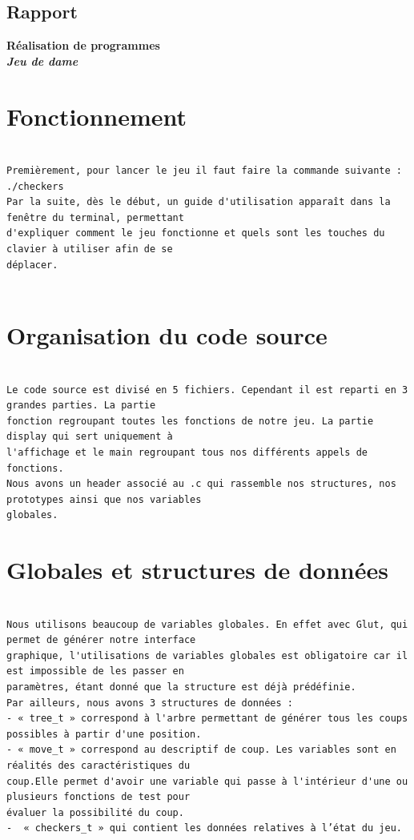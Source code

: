 \documentclass[a4paper]{article}
\begin{document}
\begin{center}\section*{Rapport}
{\Large\bf
Réalisation de programmes\\}
\large\bf\it{Jeu de dame}
\end{center}


\section{Fonctionnement}

\begin{verbatim}

Premièrement, pour lancer le jeu il faut faire la commande suivante : ./checkers
Par la suite, dès le début, un guide d'utilisation apparaît dans la fenêtre du terminal, permettant
d'expliquer comment le jeu fonctionne et quels sont les touches du clavier à utiliser afin de se 
déplacer.
 

\end{verbatim}


\section{Organisation du code source}


\begin{verbatim}

Le code source est divisé en 5 fichiers. Cependant il est reparti en 3 grandes parties. La partie
fonction regroupant toutes les fonctions de notre jeu. La partie display qui sert uniquement à
l'affichage et le main regroupant tous nos différents appels de fonctions.
Nous avons un header associé au .c qui rassemble nos structures, nos prototypes ainsi que nos variables 
globales.

\end{verbatim}


\section{Globales et structures de données}


\begin{verbatim}

Nous utilisons beaucoup de variables globales. En effet avec Glut, qui permet de générer notre interface
graphique, l'utilisations de variables globales est obligatoire car il est impossible de les passer en
paramètres, étant donné que la structure est déjà prédéfinie.
Par ailleurs, nous avons 3 structures de données :
- « tree_t » correspond à l'arbre permettant de générer tous les coups possibles à partir d'une position.
- « move_t » correspond au descriptif de coup. Les variables sont en réalités des caractéristiques du 
coup.Elle permet d'avoir une variable qui passe à l'intérieur d'une ou plusieurs fonctions de test pour
évaluer la possibilité du coup.
-  « checkers_t » qui contient les données relatives à l’état du jeu.

\end{verbatim}
\large\bf{}
\end{document}
